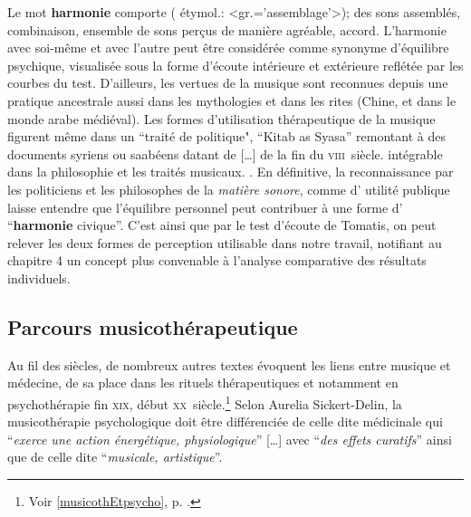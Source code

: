 Le mot \textbf{harmonie} comporte  ( étymol.:
<gr.='assemblage'>);
 des sons assemblés, combinaison, ensemble de sons perçus de manière agréable, accord.
 L'harmonie avec soi-même et avec l'autre peut être considérée comme  synonyme d'équilibre
psychique, visualisée sous la forme d'écoute intérieure et extérieure
reflétée par les courbes du test.
D'ailleurs, les vertues de la musique sont reconnues depuis une pratique
ancestrale aussi 
dans les mythologies et dans les rites (Chine, et dans le monde arabe
médiéval). 
Les formes d'utilisation 
thérapeutique de la musique figurent même dans un ``traité de politique",
``Kitab as Syasa'' remontant à des documents syriens ou saabéens datant de  [\dots] de la fin du 
\textsc{viii}\ieme\ siècle.   intégrable dans la 
philosophie et les traités musicaux. \autocite[ch. III, p. 
96]{vrait_musicotherapie_2018}.
En définitive, la reconnaissance par les  politiciens  et les
philosophes de la \textit{matière sonore}, comme d' utilité
publique laisse entendre que l'équilibre personnel
peut contribuer à une forme d' ``\textbf{harmonie }civique''.
C'est ainsi que par le test d'écoute de Tomatis, on peut
relever les deux formes de perception utilisable dans notre travail,
notifiant au chapitre 4 un concept plus convenable à l'analyse
comparative des résultats individuels.

 

\subsection{Parcours musicothérapeutique}
Au fil des siècles, de nombreux autres 
textes évoquent les liens entre musique et médecine, de sa place dans les 
rituels thérapeutiques et notamment en psychothérapie fin \textsc{xix}\ieme, 
début \textsc{xx}\ieme\ siècle.\footnote{Voir \ref{musicothEtpsycho},
  p. \pageref{musicothEtpsycho}.}
Selon Aurelia Sickert-Delin, la musicothérapie 
psychologique doit être différenciée de celle dite médicinale qui 
\enquote{\emph{exerce une action 
énergétique, physiologique}} [\dots] avec \enquote{\emph{des effets curatifs}}  
ainsi que de celle dite \enquote{\emph{musicale, artistique}}. 

